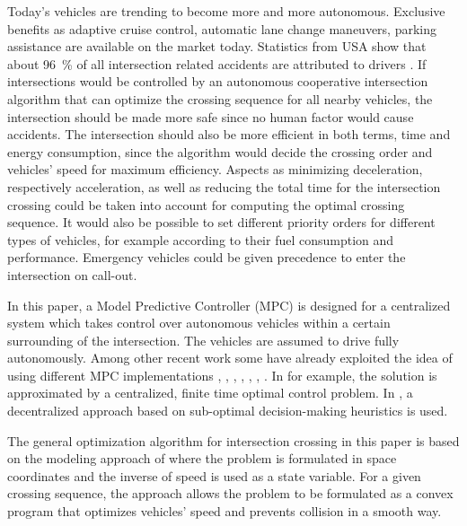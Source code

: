 \documentclass[letterpaper,10pt,conference]{ieeeconf}
\begin{document}
Today's vehicles are trending to become more and more autonomous. Exclusive benefits as adaptive cruise control, automatic lane change maneuvers, parking assistance are available on the market today. Statistics from USA show that about \SI{96}{\%} of all intersection related accidents are attributed to drivers \cite{nhtsa}. If intersections would be controlled by an autonomous cooperative intersection algorithm that can optimize the crossing sequence for all nearby vehicles, the intersection should be made more safe since no human factor would cause accidents. The intersection should also be more efficient in both terms, time and energy consumption, since the algorithm would decide the crossing order and vehicles' speed for maximum efficiency. Aspects as minimizing deceleration, respectively acceleration, as well as reducing the total time for the intersection crossing could be taken into account for computing the optimal crossing sequence. It would also be possible to set different priority orders for different types of vehicles, for example according to their fuel consumption and performance. Emergency vehicles could be given precedence to enter the intersection on call-out.

In this paper, a Model Predictive Controller (MPC) is designed for a centralized system which takes control over autonomous vehicles within a certain surrounding of the intersection. The vehicles are assumed to drive fully autonomously. Among other recent work some have already exploited the idea of using different MPC implementations \cite{eleven}, \cite{twelve}, \cite{thirteen}, \cite{fourteen}, \cite{fifteen}, \cite{gillet}, \cite{nikolce}. In \cite{thirteen} for example, the solution is approximated by a centralized, finite time optimal control problem. In \cite{fourteen}, a decentralized approach based on sub-optimal decision-making heuristics is used.

The general optimization algorithm for intersection crossing in this
paper is based on the modeling approach of \cite{nikolce} where the
problem is formulated in space coordinates and the inverse of speed is
used as a state variable. For a given crossing sequence, the approach
allows the problem to be formulated as a convex program that optimizes
vehicles' speed and prevents collision in a smooth way. 
\end{document}

